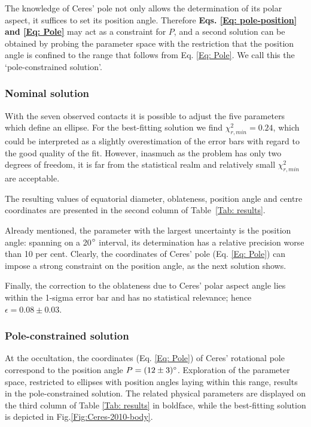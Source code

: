 \documentclass[useAMS,usenatbib]{mn2e}
\begin{document}
The knowledge of Ceres' pole not only allows the determination of its polar aspect, it suffices to set its position angle. Therefore \textbf{Eqs. \ref{Eq: pole-position} and \ref{Eq: Pole}} may act as a constraint for $P$, and a second solution can be obtained by probing the parameter space with the restriction that the position angle is confined to the range that follows from Eq. \ref{Eq: Pole}. We call this the `pole-constrained solution'.


\subsubsection{Nominal solution}

With the seven observed contacts it is possible to adjust the five parameters which define an ellipse. For the best-fitting solution we find $\chi^2_{r,min} = 0.24$, which could be interpreted as a slightly overestimation of the error bars with regard to the good quality of the fit. However, inasmuch as the problem has only two degrees of freedom, it is far from the statistical realm and relatively small $\chi^2_{r,min}$ are acceptable.

The resulting values of equatorial diameter, oblateness, position angle and centre coordinates are presented in the second column of Table~\ref{Tab: results}.%

Already mentioned, the parameter with the largest uncertainty is the position angle: spanning on a 20$\hbox{$^\circ$}$ interval, its determination has a relative precision worse than 10 per cent. Clearly, the coordinates of Ceres' pole (Eq. \ref{Eq: Pole}) can impose a strong constraint on the position angle, as the next solution shows.

Finally, the correction to the oblateness due to Ceres' polar aspect angle lies within the 1-sigma error bar and has no statistical relevance; hence $\epsilon = 0.08 \pm 0.03$.





\subsubsection{Pole-constrained solution}

At the occultation, the coordinates (Eq. \ref{Eq: Pole}) of Ceres' rotational pole correspond to the position angle $P = (12 \pm 3)\hbox{$^\circ$}$. Exploration of the parameter space, restricted to ellipses with position angles laying within this range, results in the pole-constrained solution. The related physical parameters are displayed on the third column of Table \ref{Tab: results} in boldface, while the best-fitting solution is depicted in Fig.\ref{Fig:Ceres-2010-body}.
\end{document}
